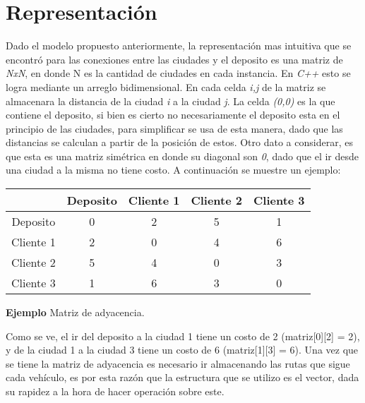 \documentclass[letter, 10pt]{article}
\begin{document}
\newpage
\section{Representaci\'on}
Dado el modelo propuesto anteriormente, la representaci\'on mas intuitiva que se encontr\'o para las conexiones entre las ciudades y el deposito es una matriz de \emph{NxN}, 
en donde N es la cantidad de ciudades en cada instancia. En \emph{C++} esto se logra mediante un arreglo bidimensional. En cada celda \emph{i,j} de la matriz se almacenara la distancia de la
ciudad \emph{i} a la ciudad \emph{j}. La celda \emph{(0,0)} es la que contiene el deposito, si bien es cierto no necesariamente el deposito esta en el principio de las ciudades, para simplificar 
se usa de esta manera, dado que las distancias se calculan a partir de la posici\'on de estos. Otro dato a considerar, es que esta es una matriz sim\'etrica en donde su diagonal son \emph{0}, dado 
que el ir desde una ciudad a la misma no tiene costo. A continuaci\'on se muestre un ejemplo:

\begin{center}
 \begin{tabular}[t]{|c|c|c|c|c|}
\hline
           & Deposito & Cliente 1 & Cliente 2 & Cliente 3 \\
\hline
Deposito   & 0        & 2        & 5        & 1\\
\hline
Cliente 1   & 2        & 0        & 4        & 6\\
\hline
Cliente 2   & 5        & 4        & 0        & 3\\
\hline
Cliente 3   & 1        & 6        & 3        & 0\\
\hline
\end{tabular}

\end{center}
\begin{center}
\textbf{Ejemplo} Matriz de adyacencia. 
\end{center}
Como se ve, el ir del deposito a la ciudad 1 tiene un costo de 2 (matriz[0][2] = 2), y de la ciudad 1 a la ciudad 3 tiene un costo de 6 (matriz[1][3] = 6).
\newline
Una vez que se tiene la matriz de adyacencia es necesario ir almacenando las rutas que sigue cada veh\'iculo, es por esta raz\'on que la estructura que se utilizo es el vector, dada su rapidez 
a la hora de hacer operaci\'on sobre este.
\end{document}
